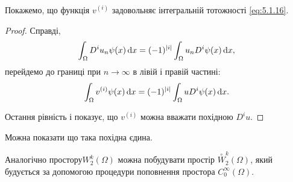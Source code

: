 \begin{proposition}
    Покажемо, що функція $v^{(i)}$ задовольняє інтегральній тотожності \eqref{eq:5.1.16}.
\end{proposition}

\begin{proof}
    Справді,
    \begin{equation*}
        \int_\Omega D^i u_n \psi(x) \mathop{}\!\mathrm{d} x = (-1)^{|i|} \int_\Omega u_n D^i \psi(x) \mathop{}\!\mathrm{d} x,
    \end{equation*}
    перейдемо до границі при $n \to \infty$ в лівій і правій частині:
    \begin{equation}
        \label{eq:5.1.17}
        \int_\Omega v^{(i)} \psi(x) \mathop{}\!\mathrm{d} x = (-1)^{|i|} \int_\Omega u D^i \psi(x) \mathop{}\!\mathrm{d} x.
    \end{equation}

    Остання рівність і показує, що $v^{(i)}$ можна вважати похідною $D^i u$. 
\end{proof}

\begin{remark}
    Можна показати що така похідна єдина.
\end{remark}

\begin{remark}
    Аналогічно простору$W_2^k(\Omega)$ можна побудувати простір $\overset{\circ}{W}_2^k(\Omega)$, який будується за допомогою процедури поповнення простора $C_0^\infty(\Omega)$.
\end{remark}
